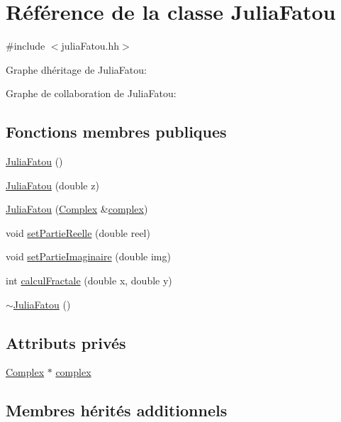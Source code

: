 \hypertarget{classJuliaFatou}{}\section{Référence de la classe Julia\+Fatou}
\label{classJuliaFatou}


{\ttfamily \#include $<$julia\+Fatou.\+hh$>$}



Graphe d\textquotesingle{}héritage de Julia\+Fatou\+:


Graphe de collaboration de Julia\+Fatou\+:
\subsection*{Fonctions membres publiques}
\begin{DoxyCompactItemize}
\item 
\hyperlink{classJuliaFatou_a0d41bea63830066fca93cb4123df1b8e}{Julia\+Fatou} ()
\item 
\hyperlink{classJuliaFatou_a66e5f0b4ca4434b156162545048e8c51}{Julia\+Fatou} (double z)
\item 
\hyperlink{classJuliaFatou_aacc9e685e952fcf3c048f4fa4bd2d0d7}{Julia\+Fatou} (\hyperlink{classComplex}{Complex} \&\hyperlink{classJuliaFatou_aa282b95e3801401a80a96adedaff11d0}{complex})
\item 
void \hyperlink{classJuliaFatou_a5b89c7a96e48d5bdc0b044454fae0113}{set\+Partie\+Reelle} (double reel)
\item 
void \hyperlink{classJuliaFatou_a99b8e79f86a6a189f861f8273b1a6405}{set\+Partie\+Imaginaire} (double img)
\item 
int \hyperlink{classJuliaFatou_ac3fbb733a74a780dfc096df4ca64da69}{calcul\+Fractale} (double x, double y)
\item 
\hyperlink{classJuliaFatou_a7220625bde7cd3720c7999f0f4cd6d65}{$\sim$\+Julia\+Fatou} ()
\end{DoxyCompactItemize}
\subsection*{Attributs privés}
\begin{DoxyCompactItemize}
\item 
\hyperlink{classComplex}{Complex} $\ast$ \hyperlink{classJuliaFatou_aa282b95e3801401a80a96adedaff11d0}{complex}
\end{DoxyCompactItemize}
\subsection*{Membres hérités additionnels}


